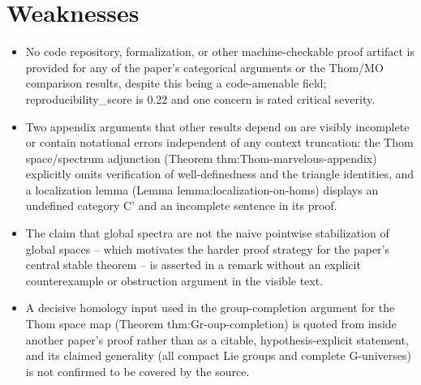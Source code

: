 \documentclass[11pt]{article}
\begin{document}
\section*{Weaknesses}
\begin{itemize}[leftmargin=*]
  \item No code repository, formalization, or other machine-checkable proof artifact is provided for any of the paper's categorical arguments or the Thom/MO comparison results, despite this being a code-amenable field; reproducibility\_score is 0.22 and one concern is rated critical severity.
  \item Two appendix arguments that other results depend on are visibly incomplete or contain notational errors independent of any context truncation: the Thom space/spectrum adjunction (Theorem thm:Thom-marvelous-appendix) explicitly omits verification of well-definedness and the triangle identities, and a localization lemma (Lemma lemma:localization-on-homs) displays an undefined category C' and an incomplete sentence in its proof.
  \item The claim that global spectra are not the naive pointwise stabilization of global spaces -- which motivates the harder proof strategy for the paper's central stable theorem -- is asserted in a remark without an explicit counterexample or obstruction argument in the visible text.
  \item A decisive homology input used in the group-completion argument for the Thom space map (Theorem thm:Gr-oup-completion) is quoted from inside another paper's proof rather than as a citable, hypothesis-explicit statement, and its claimed generality (all compact Lie groups and complete G-universes) is not confirmed to be covered by the source.
\end{itemize}
\end{document}
